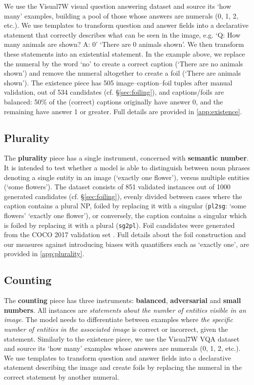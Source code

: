 \documentclass[11pt]{article}
\begin{document}
We use the Visual7W visual question answering dataset \citep{zhu2016cvpr} and source its `how many' examples, building a pool of those whose answers are numerals (0, 1, 2, etc.).
We use
templates
to transform question and answer fields into a declarative statement that correctly describes what can be seen in the image, e.g.
`Q: How many animals are shown? A: 0'  `There are 0 animals shown'.
We then transform these statements into an existential statement. In the example above, we replace the numeral by the word `no' to create a correct caption
(`There are no animals shown')
and remove the numeral altogether to create a foil
(`There are animals shown').
The existence piece has
505 image--caption--foil tuples after manual validation, out of 534 candidates (cf. \S \ref{sec:foiling}),
and captions/foils are balanced: 50\% of the (correct) captions originally have answer 0, and the remaining have answer 1 or greater.
Full details are provided in \ref{app:existence}.



\subsection{Plurality}
The \textbf{plurality} piece has a single instrument, concerned with {\bf semantic number}. It is intended to test whether a model is able to distinguish between noun phrases denoting a single entity in an image (`exactly one flower'), versus multiple entities (`some flowers'). The dataset consists of
851 validated instances out of 1000 generated candidates (cf. \S \ref{sec:foiling}),
evenly divided between cases where the caption contains a plural NP, foiled by replacing it with a singular ({\tt pl2sg}: `some flowers'  `exactly one flower'), or conversely, the caption contains a singular which is foiled by replacing it with a plural ({\tt sg2pl}). 
Foil candidates were generated from the COCO 2017 validation set \cite{Chen2015}.
Full details about the foil construction and our measures against introducing biases with quantifiers such as `exactly one', are provided in \ref{app:plurality}.

\subsection{Counting}\label{subsec:counting}
The {\bf counting} piece has three instruments: {\bf balanced}, {\bf adversarial} and {\bf small numbers}.
All instances are \textit{statements about the number of entities visible in an image}.
The model needs to differentiate between examples where \textit{the specific number of entities in the associated image} is correct or incorrect, given the statement.
Similarly to the existence piece, we use the Visual7W VQA dataset \citep{zhu2016cvpr} and source its `how many' examples whose answers are numerals (0, 1, 2, etc.).
We use 
templates
to transform question and answer fields into a declarative statement describing the image and create foils by replacing the numeral in the correct statement by another numeral.
\end{document}
